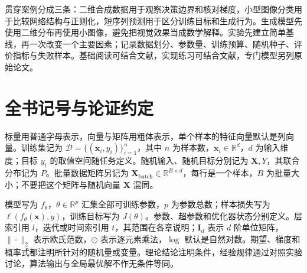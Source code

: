 贯穿案例分成三条：二维合成数据用于观察决策边界和核对梯度，小型图像分类用于比较网络结构与正则化，短序列预测用于区分训练目标和生成行为。生成模型先使用二维分布再使用小图像，避免把视觉效果当成数学解释。实验先建立简单基线，再一次改变一个主要因素；记录数据划分、参数量、训练预算、随机种子、评价指标与失败样本。基础阅读可结合文献\cite{goodfellow2016}，实现练习可结合文献\cite{d2l}，专门模型另列原始论文。

\section*{全书记号与论证约定}
标量用普通字母表示，向量与矩阵用粗体表示，单个样本的特征向量默认是列向量。训练集记为 $\mathcal D=\{(\mathbf x_i,y_i)\}_{i=1}^{n}$，其中 $n$ 为样本数，$\mathbf x_i\in\mathbb R^d$，$d$ 为输入维度；目标 $y_i$ 的取值空间随任务定义。随机输入、随机目标分别记为 $\mathbf X,Y$，其联合分布记为 $P$。批量数据矩阵另记为 $\mathbf X_{\mathrm{batch}}\in\mathbb R^{B\times d}$，每行是一个样本，$B$ 为批量大小；不要把这个矩阵与随机向量 $\mathbf X$ 混同。

模型写为 $f_\theta$，$\theta\in\mathbb R^p$ 汇集全部可训练参数，$p$ 为参数总数；样本损失写为 $\ell(f_\theta(\mathbf x),y)$，训练目标写为 $J(\theta)$。参数、超参数和优化器状态分别定义。层索引用 $l$，迭代或时间索引用 $t$，其范围在各章说明；$\mathbf I_d$ 表示 $d$ 阶单位矩阵，$\|\cdot\|_2$ 表示欧氏范数，$\odot$ 表示逐元素乘法，$\log$ 默认是自然对数。期望、梯度和概率式都注明所针对的随机量或变量。理论结论注明条件，经验规律通过对照实验讨论，算法输出与全局最优解不作无条件等同。

